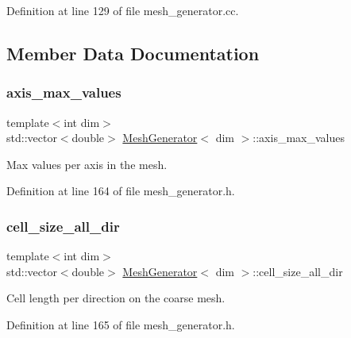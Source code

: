 Definition at line 129 of file mesh\+\_\+generator.\+cc.



\subsection{Member Data Documentation}
\mbox{\label{class_mesh_generator_ab65cdce3616c05ca7b02f88a63c7a403}} 
\subsubsection{\texorpdfstring{axis\+\_\+max\+\_\+values}{axis\_max\_values}}
{\footnotesize\ttfamily template$<$int dim$>$ \\
std\+::vector$<$double$>$ \hyperlink{class_mesh_generator}{Mesh\+Generator}$<$ dim $>$\+::axis\+\_\+max\+\_\+values\hspace{0.3cm}{\ttfamily [private]}}



Max values per axis in the mesh. 



Definition at line 164 of file mesh\+\_\+generator.\+h.

\mbox{\label{class_mesh_generator_a55a1699f8cdb9418486af6b0fa3487cc}} 
\subsubsection{\texorpdfstring{cell\+\_\+size\+\_\+all\+\_\+dir}{cell\_size\_all\_dir}}
{\footnotesize\ttfamily template$<$int dim$>$ \\
std\+::vector$<$double$>$ \hyperlink{class_mesh_generator}{Mesh\+Generator}$<$ dim $>$\+::cell\+\_\+size\+\_\+all\+\_\+dir\hspace{0.3cm}{\ttfamily [private]}}



Cell length per direction on the coarse mesh. 



Definition at line 165 of file mesh\+\_\+generator.\+h.

